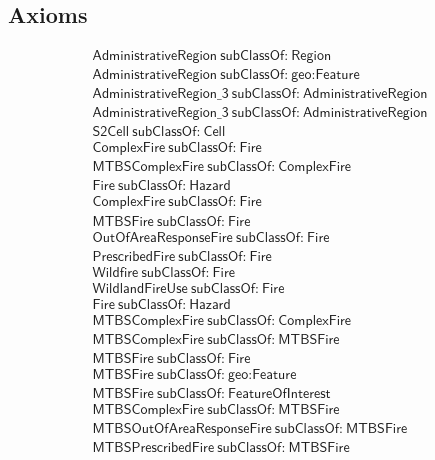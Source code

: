 \subsection{Axioms}
\begin{align}
  \textsf{AdministrativeRegion}~\textsf{subClassOf:}~\textsf{Region}\\
  \textsf{AdministrativeRegion}~\textsf{subClassOf:}~\textsf{geo:Feature}\\
  \textsf{AdministrativeRegion\_3}~\textsf{subClassOf:}~\textsf{AdministrativeRegion}\\
  \textsf{AdministrativeRegion\_3}~\textsf{subClassOf:}~\textsf{AdministrativeRegion}\\
  \textsf{S2Cell}~\textsf{subClassOf:}~\textsf{Cell}\\
  \textsf{ComplexFire}~\textsf{subClassOf:}~\textsf{Fire}\\
  \textsf{MTBSComplexFire}~\textsf{subClassOf:}~\textsf{ComplexFire}\\
  \textsf{Fire}~\textsf{subClassOf:}~\textsf{Hazard}\\
  \textsf{ComplexFire}~\textsf{subClassOf:}~\textsf{Fire}\\
  \textsf{MTBSFire}~\textsf{subClassOf:}~\textsf{Fire}\\
  \textsf{OutOfAreaResponseFire}~\textsf{subClassOf:}~\textsf{Fire}\\
  \textsf{PrescribedFire}~\textsf{subClassOf:}~\textsf{Fire}\\
  \textsf{Wildfire}~\textsf{subClassOf:}~\textsf{Fire}\\
  \textsf{WildlandFireUse}~\textsf{subClassOf:}~\textsf{Fire}\\
  \textsf{Fire}~\textsf{subClassOf:}~\textsf{Hazard}\\
  \textsf{MTBSComplexFire}~\textsf{subClassOf:}~\textsf{ComplexFire}\\
  \textsf{MTBSComplexFire}~\textsf{subClassOf:}~\textsf{MTBSFire}\\
  \textsf{MTBSFire}~\textsf{subClassOf:}~\textsf{Fire}\\
  \textsf{MTBSFire}~\textsf{subClassOf:}~\textsf{geo:Feature}\\
  \textsf{MTBSFire}~\textsf{subClassOf:}~\textsf{FeatureOfInterest}\\
  \textsf{MTBSComplexFire}~\textsf{subClassOf:}~\textsf{MTBSFire}\\
  \textsf{MTBSOutOfAreaResponseFire}~\textsf{subClassOf:}~\textsf{MTBSFire}\\
  \textsf{MTBSPrescribedFire}~\textsf{subClassOf:}~\textsf{MTBSFire}\\

\end{align}
